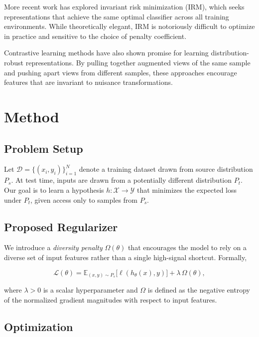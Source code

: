 \documentclass[12pt]{article}
\begin{document}
More recent work has explored invariant risk minimization (IRM), which seeks
representations that achieve the same optimal classifier across all training
environments. While theoretically elegant, IRM is notoriously difficult to
optimize in practice and sensitive to the choice of penalty coefficient.

Contrastive learning methods have also shown promise for learning
distribution-robust representations. By pulling together augmented views of
the same sample and pushing apart views from different samples, these
approaches encourage features that are invariant to nuisance transformations.

\section{Method}

\subsection{Problem Setup}

Let $\mathcal{D} = \{(x_i, y_i)\}_{i=1}^{N}$ denote a training dataset drawn
from source distribution $P_s$. At test time, inputs are drawn from a
potentially different distribution $P_t$. Our goal is to learn a hypothesis
$h: \mathcal{X} \to \mathcal{Y}$ that minimizes the expected loss under $P_t$,
given access only to samples from $P_s$.

\subsection{Proposed Regularizer}

We introduce a \emph{diversity penalty} $\Omega(\theta)$ that encourages the
model to rely on a diverse set of input features rather than a single
high-signal shortcut. Formally,

\begin{equation}
  \mathcal{L}(\theta) = \mathbb{E}_{(x,y)\sim P_s}\bigl[\ell(h_\theta(x), y)\bigr]
  + \lambda\,\Omega(\theta),
\end{equation}

where $\lambda > 0$ is a scalar hyperparameter and $\Omega$ is defined as the
negative entropy of the normalized gradient magnitudes with respect to input
features.

\subsection{Optimization}
\end{document}
